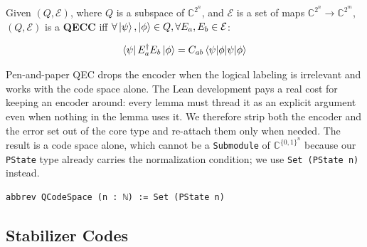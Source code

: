 \begin{definition}
    Given $(Q, \mathcal{E})$, where $Q$ is a subspace of $\mathbb{C}^{2^n}$, and
    $\mathcal{E}$ is a set of maps $\mathbb{C}^{2^n}\rightarrow
    \mathbb{C}^{2^m}$, $(Q, \mathcal{E})$ is a \textbf{QECC} iff $\forall
    \ket{\psi},\ket{\phi} \in Q, \forall E_a, E_b \in \mathcal{E}$:

    $$\bra{\psi}E_a^\dagger E_b\ket{\phi}=C_{ab}\braket{\psi|\phi}$$
\end{definition}

%

Pen-and-paper QEC drops the encoder when the logical labeling is irrelevant and
works with the code space alone. The Lean development pays a real cost for
keeping an encoder around: every lemma must thread it as an explicit argument
even when nothing in the lemma uses it. We therefore strip both the encoder and
the error set out of the core type and re-attach them only when needed. The
result is a code space alone, which cannot be a \lstinline{Submodule} of
$\mathbb{C}^{\{0,1\}^n}$ because our \lstinline{PState} type already carries the
normalization condition; we use \lstinline{Set (PState n)} instead.

\begin{lstlisting}
abbrev QCodeSpace (n : ℕ) := Set (PState n)
\end{lstlisting}

\subsection{Stabilizer Codes}\label{sec:stabbackground}

%

